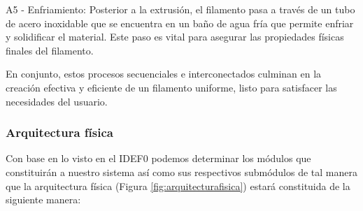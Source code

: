 \documentclass[14pt,oneside]{extarticle} %
\begin{document}
A5 - Enfriamiento: Posterior a la extrusión, el filamento pasa a través de un tubo de acero inoxidable que se encuentra en un baño de agua fría que permite enfriar y solidificar el material. Este paso es vital para asegurar las propiedades físicas finales del filamento.

En conjunto, estos procesos secuenciales e interconectados culminan en la creación efectiva y eficiente de un filamento uniforme, listo para satisfacer las necesidades del usuario.

\subsubsection{Arquitectura física}

Con base en lo visto en el IDEF0 podemos determinar los módulos que constituirán a nuestro sistema así como sus respectivos submódulos de tal manera que la arquitectura física (Figura \ref{fig:arquitecturafisica}) estará constituida de la siguiente manera:
\end{document}
